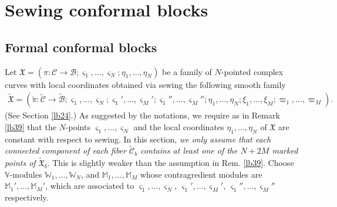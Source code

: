 \documentclass[12pt,a4paper,notitlepage]{report}
\theoremstyle{definition}
\theoremstyle{plain}
\newcommand{\fk}{\mathfrak}
\newcommand{\mc}{\mathcal}
\newcommand{\wtd}{\widetilde}
\newcommand{\sgm}{\varsigma}
\newcommand{\Vbb}{\mathbb V}
\newcommand{\Wbb}{\mathbb W}
\newcommand{\Mbb}{\mathbb M}
\numberwithin{equation}{section}
\begin{document}
\section{Sewing  conformal blocks}\label{lb76}


\subsection*{Formal conformal blocks}


Let $\fk X=(\pi:\mc C\rightarrow\mc B;\sgm_1,\dots,\sgm_N;\eta_1,\dots,\eta_N)$ be a family of $N$-pointed complex curves with local coordinates obtained via sewing the following smooth family
\begin{align*}
\wtd{\fk X}=(\wtd\pi:\wtd{\mc C}\rightarrow\wtd{\mc B};\sgm_1,\dots,\sgm_N;\sgm_1',\dots,\sgm_M';\sgm_1'',\dots,\sgm_M'';\eta_1,\dots,\eta_N;\xi_1,\dots,\xi_M;\varpi_1,\dots,\varpi_M).
\end{align*}
(See Section \ref{lb24}.) As suggested by the notations, we require as in Remark \ref{lb39} that the $N$-points  $\sgm_1,\dots,\sgm_N$ and the local coordinates $\eta_1,\dots,\eta_N$ of $\fk X$ are constant with respect to sewing. In this section, \emph{we only assume that each connected component of each fiber $\wtd{\mc C}_b$ contains at least one of the $N+2M$ marked points of $\wtd{\fk X}_b$}. This is slightly weaker than the assumption in Rem. \ref{lb39}. Choose $\Vbb$-modules $\Wbb_1,\dots,\Wbb_N$, and $\Mbb_1,\dots,\Mbb_M$ whose contragredient modules are $\Mbb_1',\dots,\Mbb_M'$, which are associated to $\sgm_1,\dots,\sgm_N$, $\sgm_1',\dots,\sgm_M'$, $\sgm_1'',\dots,\sgm_M''$ respectively.
\end{document}
